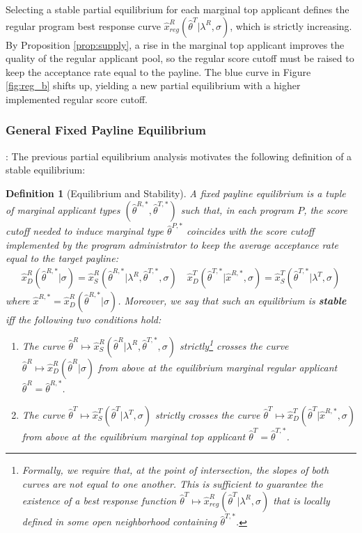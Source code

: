 \documentclass[12pt,reqno]{amsart}
\newtheorem{definition}{Definition}
\theoremstyle{definition}
\theoremstyle{plain} %
\begin{document}
\noindent Selecting a stable partial equilibrium for each marginal top applicant defines the regular program best response curve $\hat{x}^R_{reg}(\hat{\theta}^T|\lambda^R,\sigma)$, which is strictly increasing. By Proposition \ref{prop:supply}, a rise in the marginal top applicant improves the quality of the regular applicant pool, so the regular score cutoff must be raised to keep the acceptance rate equal to the payline. The blue curve in Figure \ref{fig:reg_b} shifts up, yielding a new partial equilibrium with a higher implemented regular score cutoff.

\subsubsection{General Fixed Payline Equilibrium}: The previous partial equilibrium analysis motivates the following definition of a stable equilibrium:

\begin{definition}[Equilibrium and Stability]\label{def:equilibrium}
A fixed payline equilibrium is a tuple of marginal applicant types $(\hat{\theta}^{R,*},\hat{\theta}^{T,*})$ such that, in each program $P$, the score cutoff needed to induce marginal type $\hat{\theta}^{P,*}$ coincides with the score cutoff implemented by the program administrator to keep the average acceptance rate equal to the target payline:
\begin{align*}
    \hat{x}_{D}^R(\hat{\theta}^{R,*}|\sigma) = \hat{x}_S^R(\hat{\theta}^{R,*}|\lambda^R,\hat{\theta}^{T,*},\sigma) \quad \hat{x}_{D}^T(\hat{\theta}^{T,*}|\hat{x}^{R,*},\sigma) = \hat{x}^{T}_S(\hat{\theta}^{T,*}|\lambda^T,\sigma)
\end{align*}
where $\hat{x}^{R,*}= \hat{x}_{D}^R(\hat{\theta}^{R,*}|\sigma)$. Moreover, we say that such an equilibrium is \textbf{stable} iff the following two conditions hold:
\vspace{-5pt}
\begin{enumerate}[label=(\arabic*),ref=\thedefinition(\arabic*)]
  \item The curve $\hat{\theta}^R\mapsto \hat{x}_S^{R}(\hat{\theta}^R|\lambda^R,\hat{\theta}^{T,*},\sigma)$ strictly\footnote{Formally, we require that, at the point of intersection, the slopes of both curves are not equal to one another. This is sufficient to guarantee the existence of a best response function $\hat{\theta}^T\mapsto \hat{x}^R_{reg}(\hat{\theta}^T|\lambda^R,\sigma)$ that is locally defined in some open neighborhood containing $\hat{\theta}^{T,*}$.} crosses the curve $\hat{\theta}^R\mapsto \hat{x}_D^{R}(\hat{\theta}^R|\sigma)$ from above at the equilibrium marginal regular applicant $\hat{\theta}^R = \hat{\theta}^{R,*}$. 
  \item The curve $\hat{\theta}^T\mapsto \hat{x}_S^{T}(\hat{\theta}^T|\lambda^T,\sigma)$ strictly crosses the curve $\hat{\theta}^T\mapsto \hat{x}_D^{T}(\hat{\theta}^T|\hat{x}^{R,*},\sigma)$ from above at the equilibrium marginal top applicant $\hat{\theta}^T = \hat{\theta}^{T,*}$. 
\end{enumerate}
\end{definition}
\end{document}

